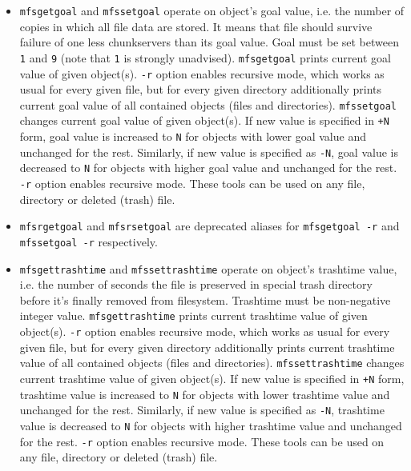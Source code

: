 \documentclass[a4paper,11pt,english]{report}
\def\code#1{\texttt{#1}}
\begin{document}
				\begin{itemize}
					\item \code{mfsgetgoal} and \code{mfssetgoal} operate on object's goal value, i.e. the number
					of copies in which all file data are stored.  It  means  that  file
					should  survive  failure  of one less chunkservers than its goal value.
					Goal must be set between \code{1} and \code{9} (note that \code{1} is strongly  unadvised).
					\code{mfsgetgoal}  prints  current  goal  value of given object(s).  \code{-r} option
					enables recursive mode, which works as usual for every given file,  but
					for every given directory additionally prints current goal value of all
					contained objects (files and directories).  \code{mfssetgoal} changes  current
					goal  value  of  given object(s). If new value is specified in \code{+N} form,
					goal value is increased to \code{N} for objects  with  lower  goal  value  and
					unchanged  for  the  rest.  Similarly, if new value is specified as \code{-N},
					goal value is decreased to \code{N} for objects with  higher  goal  value  and
					unchanged  for the rest. \code{-r} option enables recursive mode.  These tools
					can be used on any file, directory or deleted (trash) file.

					\item \code{mfsrgetgoal} and \code{mfsrsetgoal} are deprecated aliases  for  \code{mfsgetgoal  -r}
					and \code{mfssetgoal -r} respectively.

					\item \code{mfsgettrashtime}  and  \code{mfssettrashtime}  operate  on  object's  trashtime
					value, i.e. the number of seconds the  file  is  preserved  in  special
					trash directory before it's finally removed from filesystem.  Trashtime
					must be non-negative integer  value. \code{mfsgettrashtime}  prints  current
					trashtime  value of given object(s).  \code{-r} option enables recursive mode,
					which works as usual for every given file, but for every  given  directory
					additionally  prints  current  trashtime  value  of all contained
					objects  (files  and  directories).   \code{mfssettrashtime}  changes  current
					trashtime  value  of  given object(s).  If new value is specified in \code{+N}
					form, trashtime value is increased to \code{N} for objects with  lower  trashtime
					value and unchanged for the rest. Similarly, if new value is specified
					as \code{-N}, trashtime value is decreased to \code{N} for objects with  higher
					trashtime value and unchanged for the rest. \code{-r} option enables recursive
					mode.  These tools can be  used  on  any  file,  directory  or  deleted
					(trash) file.


\end{itemize}
\end{document}
